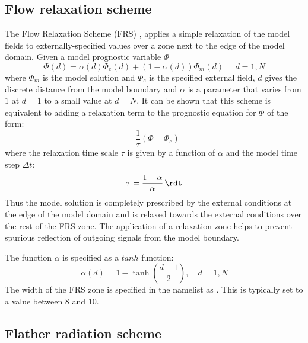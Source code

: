 \documentclass[../main/NEMO_manual]{subfiles}
\begin{document}
\subsection{Flow relaxation scheme}
\label{subsec:LBC_bdy_FRS_scheme}

The Flow Relaxation Scheme (FRS) \citep{davies_QJRMS76,engedahl_T95},
applies a simple relaxation of the model fields to externally-specified values over
a zone next to the edge of the model domain.
Given a model prognostic variable $\Phi$
\[
  \Phi(d) = \alpha(d)\Phi_{e}(d) + (1-\alpha(d))\Phi_{m}(d)\;\;\;\;\; d=1,N
\]
where $\Phi_{m}$ is the model solution and $\Phi_{e}$ is the specified external field,
$d$ gives the discrete distance from the model boundary and
$\alpha$ is a parameter that varies from $1$ at $d=1$ to a small value at $d=N$.
It can be shown that this scheme is equivalent to adding a relaxation term to
the prognostic equation for $\Phi$ of the form:
\[
  -\frac{1}{\tau}\left(\Phi - \Phi_{e}\right)
\]
where the relaxation time scale $\tau$ is given by a function of $\alpha$ and the model time step $\Delta t$:
\[
  \tau = \frac{1-\alpha}{\alpha}  \,\rdt
\]
Thus the model solution is completely prescribed by the external conditions at the edge of the model domain and
is relaxed towards the external conditions over the rest of the FRS zone.
The application of a relaxation zone helps to prevent spurious reflection of
outgoing signals from the model boundary.

The function $\alpha$ is specified as a $tanh$ function:
\[
  \alpha(d) = 1 - \tanh\left(\frac{d-1}{2}\right),       \quad d=1,N
\]
The width of the FRS zone is specified in the namelist as .
This is typically set to a value between 8 and 10.

\subsection{Flather radiation scheme}
\label{subsec:LBC_bdy_flather_scheme}
\end{document}
